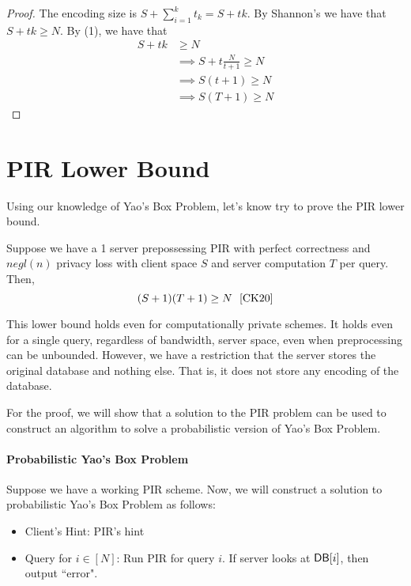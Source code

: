 \begin{proof}
    The encoding size is $S + \sum_{i=1}^k t_k = S + tk$. By Shannon's we have that $S + tk \ge N$. By (1), we have that 
    \begin{align*}
        S + tk &\ge N \\
        &\implies S + t \frac{N}{t+1} \ge N \tag{By (1)}\\
        &\implies S(t+1) \ge N \tag{Simplification}\\
        &\implies S(T+1) \ge N \tag{As $t \le T$}
    \end{align*}
\end{proof}

\section{PIR Lower Bound}
Using our knowledge of Yao's Box Problem, let's know try to prove the PIR lower bound.
\begin{theorem}
    Suppose we have a 1 server prepossessing PIR with perfect correctness and $negl(n)$ privacy loss with client space $S$ and server computation $T$ per query. Then,
    \[(S+1)(T+1) \ge  N \ \ \cite{CK20}\]
\end{theorem}
This lower bound holds even for computationally private schemes. It holds even for a single query, regardless of bandwidth, server space, even when preprocessing can be unbounded. However, we have a restriction that the server stores the original database and nothing else. That is, it does not store any encoding of the database.

\vspace{5mm}

For the proof, we will show that a solution to the PIR problem can be used to construct an algorithm to solve a probabilistic version of Yao's Box Problem.

\paragraph{Probabilistic Yao's Box Problem}
Suppose we have a working PIR scheme. Now, we will construct a solution to probabilistic Yao's Box Problem as follows:

\begin{itemize}
    \item Client's Hint: PIR's hint
    \item Query for $i \in [N]$: Run PIR for query $i$. If server looks at ${\sf DB}[i]$, then output ``error".
\end{itemize}

